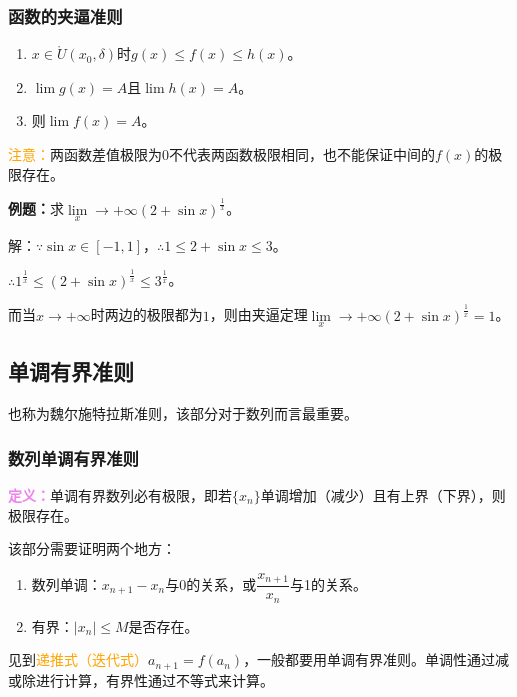 \documentclass[UTF8, 12pt]{ctexart}
\begin{document}
\subsubsection{函数的夹逼准则}

\begin{enumerate}
    \item $x\in\mathring{U}(x_0,\delta)$时$g(x)\leqslant f(x)\leqslant h(x)$。
    \item $\lim g(x)=A$且$\lim h(x)=A$。
    \item 则$\lim f(x)=A$。
\end{enumerate}

\textcolor{orange}{注意：}两函数差值极限为0不代表两函数极限相同，也不能保证中间的$f(x)$的极限存在。

\textbf{例题：}求$\lim\limits_x\to+\infty(2+\sin x)^{\frac{1}{x}}$。

解：$\because \sin x\in[-1,1]$，$\therefore 1\leqslant 2+\sin x\leqslant 3$。

$\therefore 1^{\frac{1}{x}}\leqslant\left(2+\sin x\right)^{\frac{1}{x}}\leqslant 3^{\frac{1}{x}}$。

而当$x\to+\infty$时两边的极限都为$1$，则由夹逼定理$\lim\limits_x\to+\infty(2+\sin x)^{\frac{1}{x}}=1$。

\subsection{单调有界准则}

也称为魏尔施特拉斯准则，该部分对于数列而言最重要。

\subsubsection{数列单调有界准则}

\textcolor{violet}{\textbf{定义：}}单调有界数列必有极限，即若$\{x_n\}$单调增加（减少）且有上界（下界），则极限存在。

该部分需要证明两个地方：

\begin{enumerate}
    \item 数列单调：$x_{n+1}-x_n$与0的关系，或$\dfrac{x_{n+1}}{x_n}$与1的关系。
    \item 有界：$\vert x_n\vert\leqslant M$是否存在。
\end{enumerate}

见到\textcolor{orange}{递推式（迭代式）}$a_{n+1}=f(a_n)$，一般都要用单调有界准则。单调性通过减或除进行计算，有界性通过不等式来计算。
\end{document}
